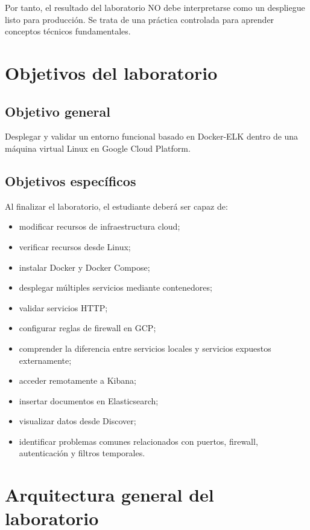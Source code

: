 \documentclass[
  coursetitle={Cómputo Nube y Tecnologías Emergentes},
  coursehours={96},
  coursedate={Verano 2026},
  doctype={Laboratorio},
  otherlangs={english,french},
  authorname={Lázaro},
  authorsurname={Bustio-Martínez},
  authortitle={PhD},
  role={Profesor Investigador},
  email={lbustio@inaoe.mx},
  phone={5559504000},
  ext={7459},
  institution={Instituto Nacional de Astrofísica, Óptica y Electrónica (INAOE)},
  department={Maestría en Ciencias en Tecnologías de Seguridad},
  address={Luis Enrique Erro 1, Sta. Ma. Tonantzintla, San Andrés Cholula, CP 72840, Puebla, México},
  margin={0.5in}
]{../../lbustio_lecture_notes}
\begin{document}
Por tanto, el resultado del laboratorio NO debe interpretarse como un despliegue listo para producción. Se trata de una práctica controlada para aprender conceptos técnicos fundamentales.

\section{Objetivos del laboratorio}

\subsection{Objetivo general}

Desplegar y validar un entorno funcional basado en Docker-ELK dentro de una máquina virtual Linux en Google Cloud Platform.

\subsection{Objetivos específicos}

Al finalizar el laboratorio, el estudiante deberá ser capaz de:

\begin{itemize}
    \item modificar recursos de infraestructura cloud;
    \item verificar recursos desde Linux;
    \item instalar Docker y Docker Compose;
    \item desplegar múltiples servicios mediante contenedores;
    \item validar servicios HTTP;
    \item configurar reglas de firewall en GCP;
    \item comprender la diferencia entre servicios locales y servicios expuestos externamente;
    \item acceder remotamente a Kibana;
    \item insertar documentos en Elasticsearch;
    \item visualizar datos desde Discover;
    \item identificar problemas comunes relacionados con puertos, firewall, autenticación y filtros temporales.
\end{itemize}

\section{Arquitectura general del laboratorio}
\end{document}
